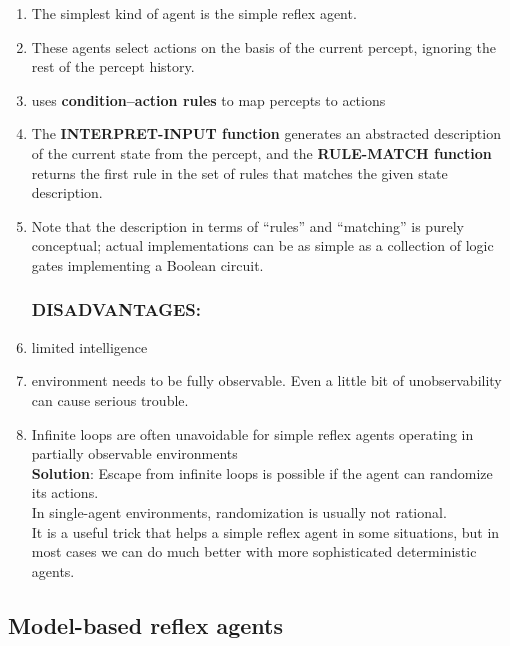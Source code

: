 \begin{enumerate}
    \item The simplest kind of agent is the simple reflex agent. 
    
    \item These agents select actions on the basis of the current percept, ignoring the rest of the percept history.

    \item uses \textbf{condition–action rules} to map percepts to actions

    \item The \textbf{INTERPRET-INPUT function} generates an abstracted description of the current state from the percept, and the \textbf{RULE-MATCH function} returns the first rule in the set of rules that matches the given state description.

    \item Note that the description in terms of “rules” and “matching” is purely conceptual; actual implementations can be as simple as a collection of logic gates implementing a Boolean circuit.

\subsubsection*{DISADVANTAGES:}

    \item limited intelligence
    
    \item environment needs to be fully observable. Even a little bit of unobservability can cause serious trouble.
    
    \item Infinite loops are often unavoidable for simple reflex agents operating in partially observable environments\\
    \textbf{Solution}: Escape from infinite loops is possible if the agent can randomize its actions.\\
    In single-agent environments, randomization is usually not rational.\\
    It is a useful trick that helps a simple reflex agent in some situations, but in most cases we can do much better with more sophisticated deterministic agents. 
\end{enumerate}



\subsection{Model-based reflex agents \cite{aci-1}}

